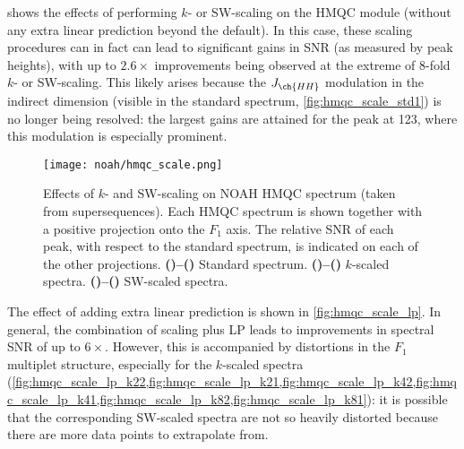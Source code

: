  shows the effects of performing $k$- or SW-scaling on the \nitrogen{} HMQC module (without any extra linear prediction beyond the default).
In this case, these scaling procedures can in fact can lead to significant gains in SNR (as measured by peak heights), with up to $2.6\times$ improvements being observed at the extreme of 8-fold $k$- or SW-scaling.
This likely arises because the $J_{\ch{HH}}$ modulation in the indirect dimension (visible in the standard spectrum, \cref{fig:hmqc_scale_std1}) is no longer being resolved: the largest gains are attained for the peak at \qty{123}{\ppm}, where this modulation is especially prominent.

\begin{figure}[!htbp]
    \centering
    \texttt{[image: noah/hmqc\_scale.png]}%
    {\label{fig:hmqc_scale_std2}}%
    {\label{fig:hmqc_scale_std1}}%
    {\label{fig:hmqc_scale_k22}}%
    {\label{fig:hmqc_scale_k21}}%
    {\label{fig:hmqc_scale_k42}}%
    {\label{fig:hmqc_scale_k41}}%
    {\label{fig:hmqc_scale_k82}}%
    {\label{fig:hmqc_scale_k81}}%
    {\label{fig:hmqc_scale_sw22}}%
    {\label{fig:hmqc_scale_sw21}}%
    {\label{fig:hmqc_scale_sw42}}%
    {\label{fig:hmqc_scale_sw41}}%
    {\label{fig:hmqc_scale_sw82}}%
    {\label{fig:hmqc_scale_sw81}}%
    \caption[Effects of $k$- and SW-scaling on NOAH HMQC spectrum]{
        Effects of $k$- and SW-scaling on NOAH HMQC spectrum (taken from  supersequences).
        Each HMQC spectrum is shown together with a positive projection onto the $F_1$ axis.
        The relative SNR of each peak, with respect to the standard spectrum, is indicated on each of the other projections.
        \textbf{()--()} Standard spectrum.
        \textbf{()--()} $k$-scaled spectra.
        \textbf{()--()} SW-scaled spectra.
    }
    \label{fig:hmqc_scale}
\end{figure}

The effect of adding extra linear prediction is shown in \cref{fig:hmqc_scale_lp}.
In general, the combination of scaling plus LP leads to improvements in spectral SNR of up to $6\times$.
However, this is accompanied by distortions in the $F_1$ multiplet structure, especially for the $k$-scaled spectra (\cref{fig:hmqc_scale_lp_k22,fig:hmqc_scale_lp_k21,fig:hmqc_scale_lp_k42,fig:hmqc_scale_lp_k41,fig:hmqc_scale_lp_k82,fig:hmqc_scale_lp_k81}): it is possible that the corresponding SW-scaled spectra are not so heavily distorted because there are more data points to extrapolate from.

